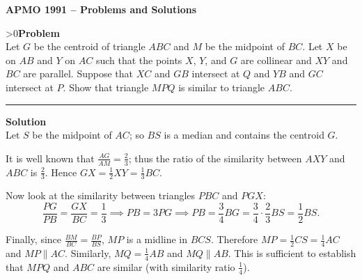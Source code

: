 \documentclass[12pt,oneside,a4paper]{book}
\newcounter{probnum}
\newcounter{solnum}
\newcommand{\prob}{\ifnum\value{probnum}>0\newpage\fi\setcounter{solnum}{0}\stepcounter{probnum}\textbf{Problem \theprobnum}\\}
\newcommand{\soln}{\stepcounter{solnum}\medskip\hrule\medbreak\textbf{Solution \thesolnum}\\}
\begin{document}
\begin{center}
\textbf{\large APMO 1991 -- Problems and Solutions}
\end{center}

\prob Let $G$ be the centroid of triangle $ABC$ and $M$ be the midpoint of $BC$. Let $X$ be on $AB$ and $Y$ on $AC$ such that the points $X$, $Y$, and $G$ are collinear and $XY$ and $BC$ are parallel. Suppose that $XC$ and $GB$ intersect at $Q$ and $YB$ and $GC$ intersect at $P$. Show that triangle $MPQ$ is similar to triangle $ABC$.

\soln
Let $S$ be the midpoint of $AC$; so $BS$ is a median and contains the centroid $G$.

\begin{center}
\end{center}

It is well known that $\frac{AG}{AM} = \frac23$; thus the ratio of the similarity between $AXY$ and $ABC$ is $\frac23$. Hence $GX = \frac12XY = \frac 13BC$.

Now look at the similarity between triangles $PBC$ and $PGX$:
\[\frac{PG}{PB} = \frac{GX}{BC} = \frac13 \implies PB = 3PG \implies PB = \frac34BG = \frac34\cdot\frac23BS = \frac12BS.\]

Finally, since $\frac{BM}{BC} = \frac{BP}{BS}$, $MP$ is a midline in $BCS$. Therefore $MP = \frac12CS = \frac14AC$ and $MP\parallel AC$. Similarly, $MQ = \frac14AB$ and $MQ\parallel AB$. This is sufficient to establish that $MPQ$ and $ABC$ are similar (with similarity ratio $\frac14$).
\end{document}
